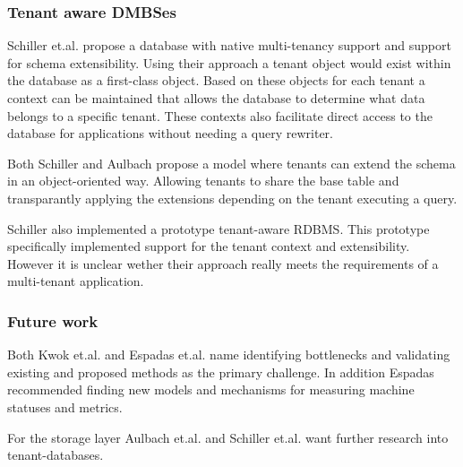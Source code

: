 \subsubsection{Tenant aware DMBSes}
Schiller et.al.\cite{schiller2011native} propose a database with native multi-tenancy support and support for schema extensibility.
Using their approach a tenant object would exist within the database as a first-class object. 
Based on these objects for each tenant a context can be maintained that allows the database to determine what data belongs to a specific tenant. 
These contexts also facilitate direct access to the database for applications without needing a query rewriter.

Both Schiller \cite{schiller2011native} and Aulbach \cite{aulbach2011extensibility} propose a model where tenants can extend the schema in an object-oriented way.
Allowing tenants to share the base table and transparantly applying the extensions depending on the tenant executing a query.

Schiller also implemented a prototype tenant-aware RDBMS.
This prototype specifically implemented support for the tenant context and extensibility.
However it is unclear wether their approach really meets the requirements of a multi-tenant application.



\subsubsection{Future work}
Both Kwok et.al. \cite{kwok2008resource} and Espadas et.al.\cite{espadas2013tenant} name identifying bottlenecks and validating existing and proposed methods as the primary challenge.
In addition Espadas recommended finding new models and mechanisms for measuring machine statuses and metrics.

For the storage layer Aulbach et.al. \cite{aulbach2009comparison, aulbach2008multi} and Schiller et.al. \cite{schiller2011native} want further research into tenant-databases.

